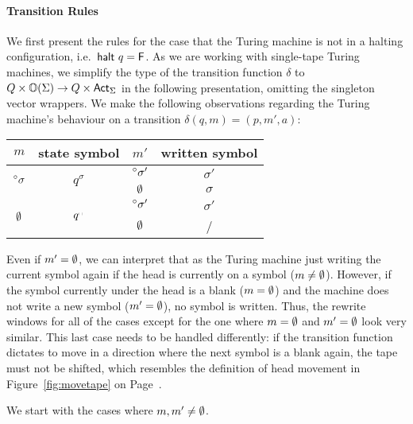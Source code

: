 \paragraph{Transition Rules}
We first present the rules for the case that the Turing machine is not in a halting configuration, i.e.\ $\textsf{halt}~q = \mathsf{F}$.
As we are working with single-tape Turing machines, we simplify the type of the transition function $\delta$ to $Q \times \mathbb{O}{(\Sigma)} \rightarrow Q \times \textsf{Act}_\Sigma$ in the following presentation, omitting the singleton vector wrappers. 
We make the following observations regarding the Turing machine's behaviour on a transition $\delta (q, m) = (p, m', a)$:
\begin{center}
  \begin{tabular}{cccc}
    $m$ & state symbol & $m'$ & written symbol \\
    \midrule
    \multirow{2}{*}{$\prescript{\circ}{}\sigma$} & \multirow{2}{*}{$q^\sigma$} & $\prescript{\circ}{}\sigma'$ & $\sigma'$ \\
    \cmidrule{3-4}
                                     & & $\emptyset$ & $\sigma$ \\
                                     \midrule
    \multirow{2}{*}{$\emptyset$} & \multirow{2}{*}{$q^\blank$} & $\prescript{\circ}{}\sigma'$ & $\sigma'$ \\
    \cmidrule{3-4}
                             & & $\emptyset$ & / 
  \end{tabular}
\end{center}
Even if $m' = \emptyset$, we can interpret that as the Turing machine just writing the current symbol again if the head is currently on a symbol ($m \neq \emptyset$). 
However, if the symbol currently under the head is a blank ($m = \emptyset$) and the machine does not write a new symbol ($m' = \emptyset$), no symbol is written.
Thus, the rewrite windows for all of the cases except for the one where $m = \emptyset$ and $m' = \emptyset$ look very similar.
This last case needs to be handled differently: if the transition function dictates to move in a direction where the next symbol is a blank again, the tape must not be shifted, which resembles the definition of head movement in Figure~\ref{fig:movetape} on Page~\pageref{fig:movetape}. 

We start with the cases where $m, m' \neq \emptyset$.


